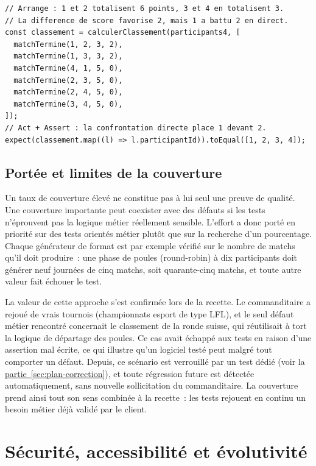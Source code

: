 \begin{lstlisting}
// Arrange : 1 et 2 totalisent 6 points, 3 et 4 en totalisent 3.
// La difference de score favorise 2, mais 1 a battu 2 en direct.
const classement = calculerClassement(participants4, [
  matchTermine(1, 2, 3, 2),
  matchTermine(1, 3, 3, 2),
  matchTermine(4, 1, 5, 0),
  matchTermine(2, 3, 5, 0),
  matchTermine(2, 4, 5, 0),
  matchTermine(3, 4, 5, 0),
]);
// Act + Assert : la confrontation directe place 1 devant 2.
expect(classement.map((l) => l.participantId)).toEqual([1, 2, 3, 4]);
\end{lstlisting}

\subsection{Portée et limites de la couverture}
Un taux de couverture élevé ne constitue pas à lui seul une preuve de qualité. Une couverture importante peut coexister avec des défauts si les tests n'éprouvent pas la logique métier réellement sensible. L'effort a donc porté en priorité sur des tests orientés métier plutôt que sur la recherche d'un pourcentage. Chaque générateur de format est par exemple vérifié sur le nombre de matchs qu'il doit produire~: une phase de poules (round-robin) à dix participants doit générer neuf journées de cinq matchs, soit quarante-cinq matchs, et toute autre valeur fait échouer le test.

La valeur de cette approche s'est confirmée lors de la recette. Le commanditaire a rejoué de vrais tournois (championnats esport de type LFL), et le seul défaut métier rencontré concernait le classement de la ronde suisse, qui réutilisait à tort la logique de départage des poules. Ce cas avait échappé aux tests en raison d'une assertion mal écrite, ce qui illustre qu'un logiciel testé peut malgré tout comporter un défaut. Depuis, ce scénario est verrouillé par un test dédié (voir la \hyperref[sec:plan-correction]{partie~\ref*{sec:plan-correction}}), et toute régression future est détectée automatiquement, sans nouvelle sollicitation du commanditaire. La couverture prend ainsi tout son sens combinée à la recette~: les tests rejouent en continu un besoin métier déjà validé par le client.


\sanssautdesection
\section{Sécurité, accessibilité et évolutivité}

